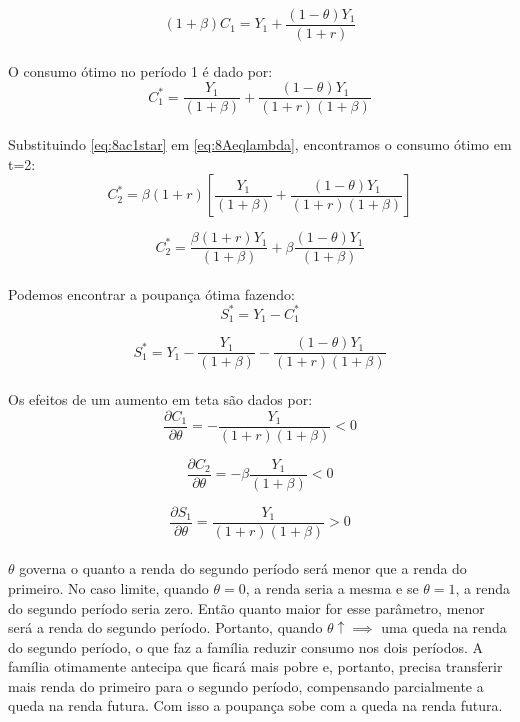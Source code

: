 \documentclass{article}
\begin{document}
\begin{equation}
    (1+\beta)C_1 = Y_1 + \frac{(1-\theta)Y_1}{(1+r)}
\end{equation}
\\
O consumo ótimo no período 1 é dado por:
\begin{equation}\label{eq:8ac1star}
    C_1^* = \frac{Y_1}{(1+\beta)} + \frac{(1-\theta)Y_1}{(1+r)(1+\beta)}
\end{equation}
\\
Substituindo \eqref{eq:8ac1star} em \eqref{eq:8Aeqlambda}, encontramos o consumo ótimo em t=2:
\begin{equation}
    C_2^*=\beta(1+r)\left[\frac{Y_1}{(1+\beta)} + \frac{(1-\theta)Y_1}{(1+r)(1+\beta)}\right]
\end{equation}

\begin{equation}
    C_2^*=\frac{\beta(1+r)Y_1}{(1+\beta)} + \beta\frac{(1-\theta)Y_1}{(1+\beta)}
\end{equation}
\\
Podemos encontrar a poupança ótima fazendo:
\begin{equation}
    S_1^* = Y_1 - C_1^*
\end{equation}

\begin{equation}
    S_1^* = Y_1 - \frac{Y_1}{(1+\beta)} - \frac{(1-\theta)Y_1}{(1+r)(1+\beta)}
\end{equation}
\\
Os efeitos de um aumento em teta são dados por:
\begin{equation}
    \frac{\partial C_1}{\partial \theta} = -\frac{Y_1}{(1+r)(1+\beta)} <0     
\end{equation}

\begin{equation}
    \frac{\partial C_2}{\partial \theta} = -\beta\frac{Y_1}{(1+\beta)} <0     
\end{equation}

\begin{equation}
    \frac{\partial S_1}{\partial \theta} = \frac{Y_1}{(1+r)(1+\beta)} >0     
\end{equation}
\\
$\theta$ governa o quanto a renda do segundo período será menor que a renda do primeiro. No caso limite, quando $\theta = 0$, a renda seria a mesma e se $\theta=1$, a renda do segundo período seria zero. Então quanto maior for esse parâmetro, menor será a renda do segundo período. Portanto, quando $\theta \uparrow \implies$ uma queda na renda do segundo período, o que faz a família reduzir consumo nos dois períodos. A família otimamente antecipa que ficará mais pobre e, portanto, precisa transferir mais renda do primeiro para o segundo período, compensando parcialmente a queda na renda futura. Com isso a poupança sobe com a queda na renda futura. 
\end{document}
